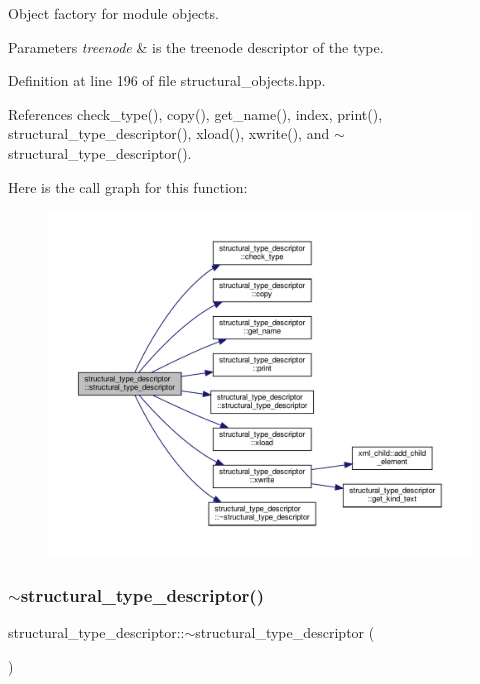 Object factory for module objects. 


\begin{DoxyParams}{Parameters}
{\em treenode} & is the treenode descriptor of the type. \\
\hline
\end{DoxyParams}


Definition at line 196 of file structural\+\_\+objects.\+hpp.



References check\+\_\+type(), copy(), get\+\_\+name(), index, print(), structural\+\_\+type\+\_\+descriptor(), xload(), xwrite(), and $\sim$structural\+\_\+type\+\_\+descriptor().

Here is the call graph for this function\+:
\nopagebreak
\begin{figure}[H]
\begin{center}
\leavevmode
\includegraphics[width=350pt]{dc/da4/structstructural__type__descriptor_a9e965d998e698f23d74613c28725682a_cgraph}
\end{center}
\end{figure}
\mbox{\label{structstructural__type__descriptor_a94a522503d02e9da39327fdf09a43a17}} 
\subsubsection{\texorpdfstring{$\sim$structural\+\_\+type\+\_\+descriptor()}{~structural\_type\_descriptor()}}
{\footnotesize\ttfamily structural\+\_\+type\+\_\+descriptor\+::$\sim$structural\+\_\+type\+\_\+descriptor (\begin{DoxyParamCaption}{ }\end{DoxyParamCaption})\hspace{0.3cm}{\ttfamily [default]}}



